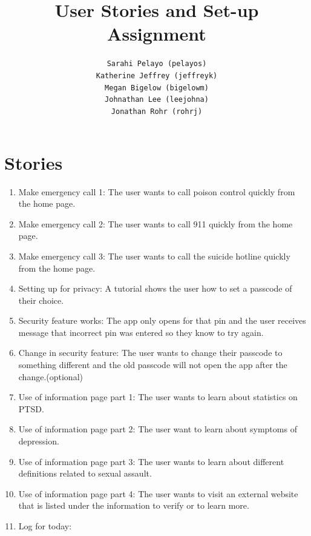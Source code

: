 \documentclass[letterpaper,12pt,titlepage]{article}
\title{User Stories and Set-up Assignment}
\author{
  \texttt{Sarahi Pelayo (pelayos)}
  \\[.5ex]
  \texttt{Katherine Jeffrey (jeffreyk)}
  \\[.5ex]
  \texttt{Megan Bigelow (bigelowm)}
  \\[.5ex]
  \texttt{Johnathan Lee (leejohna)}
  \\[.5ex]
  \texttt{Jonathan Rohr (rohrj)}
}
\begin{document}
\maketitle

\section{Stories}
\begin{enumerate}
\item Make emergency call 1:
\newline
The user wants to call poison control quickly from the home page.
\item Make emergency call 2:
\newline
The user wants to call 911 quickly from the home page.
\item Make emergency call 3:
\newline
The user wants to call the suicide hotline quickly from the home page.
\item Setting up for privacy:
\newline
A tutorial shows the user how to set a passcode of their choice.
\item Security feature works:
\newline
The app only opens for that pin and the user receives message that incorrect pin was entered so they know to try again.
\item Change in security feature:
\newline
The user wants to change their passcode to something different and the old passcode will not open the app after the change.(optional)
\item Use of information page part 1:
\newline
The user wants to learn about statistics on PTSD.
\item Use of information page part 2:
\newline
The user want to learn about symptoms of depression.
\item Use of information page part 3:
\newline
The user wants to learn about different definitions related to sexual assault.
\item Use of information page part 4:
\newline
The user wants to visit an external website that is listed under the information to verify or to learn more.
\item Log for today:
\newline

\end{enumerate}
\end{document}
